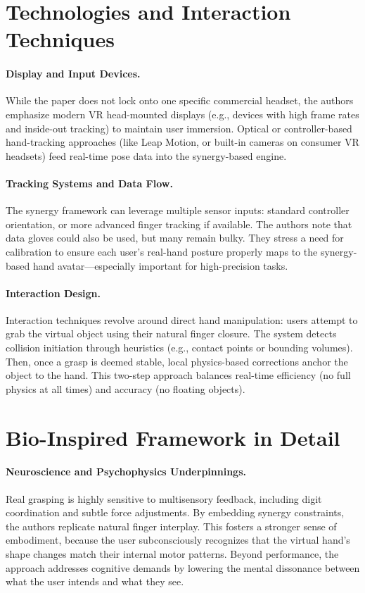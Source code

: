 \documentclass{llncs}
\begin{document}
\section*{Technologies and Interaction Techniques}
\paragraph{Display and Input Devices.}
While the paper does not lock onto one specific commercial headset, the authors emphasize modern VR head-mounted displays (e.g., devices with high frame rates and inside-out tracking) to maintain user immersion. Optical or controller-based hand-tracking approaches (like Leap Motion, or built-in cameras on consumer VR headsets) feed real-time pose data into the synergy-based engine.

\paragraph{Tracking Systems and Data Flow.}
The synergy framework can leverage multiple sensor inputs: standard controller orientation, or more advanced finger tracking if available. The authors note that data gloves could also be used, but many remain bulky. They stress a need for calibration to ensure each user's real-hand posture properly maps to the synergy-based hand avatar—especially important for high-precision tasks.

\paragraph{Interaction Design.}
Interaction techniques revolve around direct hand manipulation: users attempt to grab the virtual object using their natural finger closure. The system detects collision initiation through heuristics (e.g., contact points or bounding volumes). Then, once a grasp is deemed stable, local physics-based corrections anchor the object to the hand. This two-step approach balances real-time efficiency (no full physics at all times) and accuracy (no floating objects).

\section*{Bio-Inspired Framework in Detail}
\paragraph{Neuroscience and Psychophysics Underpinnings.}
Real grasping is highly sensitive to multisensory feedback, including digit coordination and subtle force adjustments. By embedding synergy constraints, the authors replicate natural finger interplay. This fosters a stronger sense of embodiment, because the user subconsciously recognizes that the virtual hand’s shape changes match their internal motor patterns. Beyond performance, the approach addresses cognitive demands by lowering the mental dissonance between what the user intends and what they see.
\end{document}
